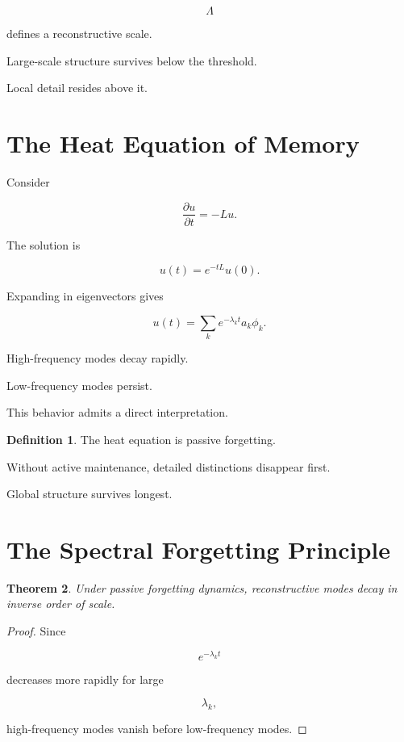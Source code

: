 \documentclass[12pt,oneside]{book}
\theoremstyle{plain} \newtheorem{theorem}{Theorem}[chapter] \newtheorem{lemma}[theorem]{Lemma} \newtheorem{proposition}[theorem]{Proposition} \newtheorem{corollary}[theorem]{Corollary}
\theoremstyle{definition} \newtheorem{definition}[theorem]{Definition} \newtheorem{axiom}[theorem]{Axiom} \newtheorem{construction}[theorem]{Construction}
\theoremstyle{remark} \newtheorem{remark}[theorem]{Remark} \newtheorem{example}[theorem]{Example}
\begin{document}
\[
\Lambda
\]

defines a reconstructive scale.

Large-scale structure survives below the threshold.

Local detail resides above it.

\section{The Heat Equation of Memory}

Consider

\[
\frac{\partial u}{\partial t}
=
-Lu.
\]

The solution is

\[
u(t)
=
e^{-tL}u(0).
\]

Expanding in eigenvectors gives

\[
u(t)
=
\sum_k
e^{-\lambda_k t}
a_k
\phi_k.
\]

High-frequency modes decay rapidly.

Low-frequency modes persist.

This behavior admits a direct interpretation.

\begin{definition}

The heat equation is passive forgetting.

\end{definition}

Without active maintenance, detailed distinctions disappear first.

Global structure survives longest.

\section{The Spectral Forgetting Principle}

\begin{theorem}

Under passive forgetting dynamics, reconstructive modes decay in inverse order of scale.

\end{theorem}

\begin{proof}

Since

\[
e^{-\lambda_k t}
\]

decreases more rapidly for large

\[
\lambda_k,
\]

high-frequency modes vanish before low-frequency modes.

\end{proof}
\end{document}

